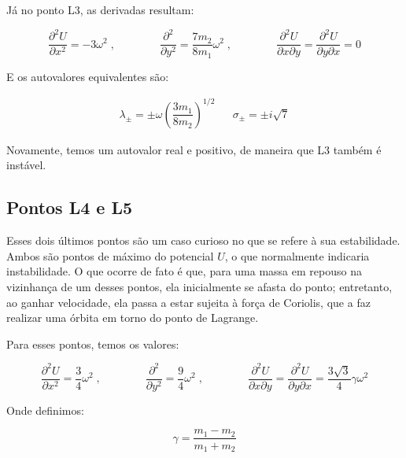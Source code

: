 Já no ponto L3, as derivadas resultam:

\begin{equation}
\dfrac{\partial ^2U}{\partial x^2} = -3\omega^2 \;, \qquad \qquad \dfrac{\partial ^2}{\partial y^2} = \frac{7m_2}{8m_1}\omega^2 \;, \qquad \qquad \dfrac{\partial ^2U}{\partial x\partial y} = \dfrac{\partial ^2U}{\partial y\partial x} = 0
\end{equation}

E os autovalores equivalentes são:

\begin{align}
\lambda_{\pm} = \pm \omega \left(\dfrac{3m_1}{8m_2}\right)^{1/2} && \sigma_{\pm} = \pm i\sqrt{7}
\end{align}

Novamente, temos um autovalor real e positivo, de maneira que L3 também é instável.

\subsection{Pontos L4 e L5}

Esses dois últimos pontos são um caso curioso no que se refere à sua estabilidade. Ambos são pontos de máximo do potencial $U$, o que normalmente indicaria instabilidade. O que ocorre de fato é que, para uma massa em repouso na vizinhança de um desses pontos, ela inicialmente se afasta do ponto; entretanto, ao ganhar velocidade, ela passa a estar sujeita à força de Coriolis, que a faz realizar uma órbita em torno do ponto de Lagrange.

Para esses pontos, temos os valores:

\begin{equation}
\dfrac{\partial ^2U}{\partial x^2} = \dfrac{3}{4}\omega^2 \;, \qquad \qquad \dfrac{\partial ^2}{\partial y^2} = \dfrac{9}{4}\omega^2 \;, \qquad \qquad \dfrac{\partial ^2U}{\partial x\partial y} = \dfrac{\partial ^2U}{\partial y\partial x} = \dfrac{3\sqrt{3}}{4}\gamma \omega^2
\end{equation}

\vspace{20px}

Onde definimos: 

\vspace{-35px}

\begin{equation*}
\!\!\!\!\!\!\!\!\!\!\!\!\!\!\!\!\!\!\!\!\!\!\!\!\!\!\!\!\!\!\!\!\!\!\!\!\!\!\!\!\!\!\!\!\!\!\!\!\!\!\!\!\!\!\!\!\!\!\!\!\!\!\!\!\!\!\!\!\!\!\!\!\!\!\!\!\!\!\!\!\!\!\!\!\!\!\!\!\!\!\!\!\!\!\!\!\!\!\!\!\!\!\!\!\!\!\!\!\!\!\!\!\!\!\!\!\!\!\!\!\!\!\!\!\!\! \gamma = \dfrac{m_1-m_2}{m_1+m_2}
\end{equation*}

